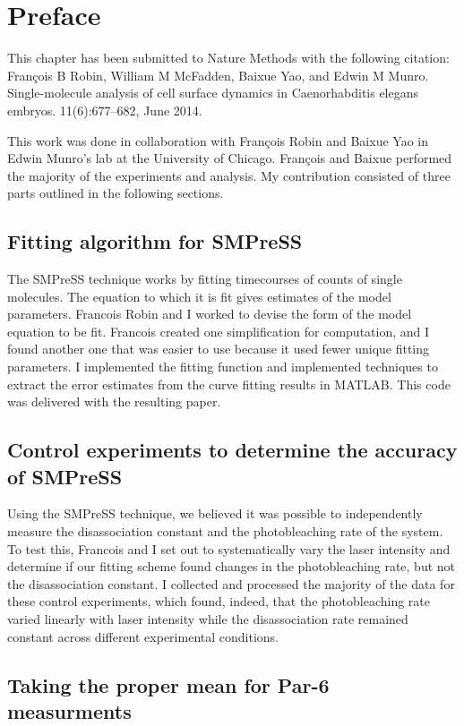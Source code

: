 \section{Preface}
This chapter has been submitted to Nature Methods with the following citation: François B Robin, William M McFadden, Baixue Yao, and Edwin M Munro. Single-molecule analysis of cell surface dynamics in Caenorhabditis elegans embryos. 11(6):677–682, June 2014.

This work was done in collaboration with Fran\c{c}ois Robin and Baixue Yao in Edwin Munro's lab at the University of Chicago.  Fran\c{c}ois and Baixue performed the majority of the experiments and analysis.  My contribution consisted of three parts outlined in the following sections.

\subsection{Fitting algorithm for SMPreSS}

The SMPreSS technique works by fitting timecourses of counts of single molecules.  The equation to which it is fit gives estimates of the model parameters.  Francois Robin and I worked to devise the form of the model equation to be fit. Francois created one simplification for computation, and I found another one that was easier to use because it used fewer unique fitting parameters.  I implemented the fitting function and implemented techniques to extract the error estimates from the curve fitting results in MATLAB.  This code was delivered with the resulting paper.

\subsection{Control experiments to determine the accuracy of SMPreSS}

Using the SMPreSS technique, we believed it was possible to independently measure the disassociation constant and the photobleaching rate of the system.  To test this, Francois and I set out to systematically vary the laser intensity and determine if our fitting scheme found changes in the photobleaching rate, but not the disassociation constant.  I collected and processed the majority of the data for these control experiments, which found, indeed, that the photobleaching rate varied linearly with laser intensity while the disassociation rate remained constant across different experimental conditions.

\subsection{Taking the proper mean for Par-6 measurments}

